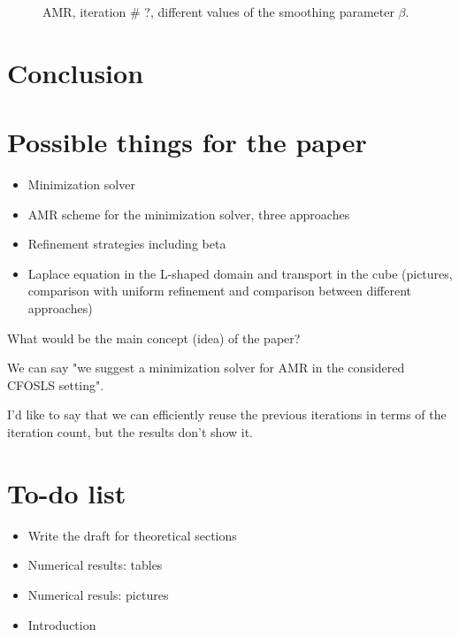 \documentclass[a4paper,12pt]{amsart}
\numberwithin{equation}{section}
\begin{document}
\begin{figure}[h!]

%
\caption{AMR, iteration \# ?, different values of the smoothing parameter $\beta$.}
\label{fig:para_3d_aniso}
\end{figure}

\section{Conclusion}


\section{Possible things for the paper}

\begin{itemize}
	\item Minimization solver
	\item AMR scheme for the minimization solver, three approaches
	\item Refinement strategies including beta	
	\item Laplace equation in the L-shaped domain and transport in the cube (pictures, comparison with uniform refinement and comparison between different approaches)
\end{itemize}

What would be the main concept (idea) of the paper?

We can say "we suggest a minimization solver for AMR in the considered CFOSLS setting".

I'd like to say that we can efficiently reuse the previous iterations in terms of the iteration count, but the results don't show it.

\section{To-do list}
\begin{itemize}
	\item Write the draft for theoretical sections
	\item Numerical results: tables
	\item Numerical resuls: pictures
	\item Introduction
\end{itemize}
\end{document}

